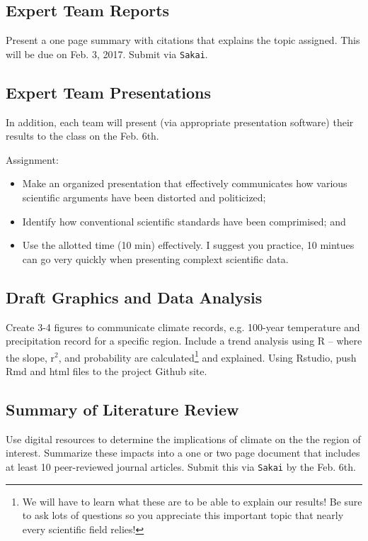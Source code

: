\documentclass{article}\usepackage[]{graphicx}\usepackage[]{color}
\begin{document}
\subsection{Expert Team Reports}

Present a one page summary with citations that explains the topic assigned. This will be due on Feb. 3, 2017. Submit via \texttt{Sakai}. 

\subsection{Expert Team Presentations}

In addition, each team will present (via appropriate presentation software) their results to the class on the Feb. 6th. 

\noindent Assignment: 
\begin{itemize}
  \item Make an organized presentation that effectively communicates how various scientific arguments have been distorted and politicized;
  \item Identify how conventional scientific standards have been comprimised; and
  \item Use the allotted time (10 min) effectively. I suggest you practice, 10 mintues can go very quickly when presenting complext scientific data.
  
\end{itemize}

\subsection{Draft Graphics and Data Analysis}

Create 3-4 figures to communicate climate records, e.g. 100-year temperature and precipitation record for a specific region. Include a trend analysis using R -- where the slope, r$^2$, and probability are calculated\footnote{We will have to learn what these are to be able to explain our results! Be sure to ask lots of questions so you appreciate this important topic that nearly every scientific field relies!} and explained. Using Rstudio, push Rmd and html files to the project Github site. 

\subsection{Summary of Literature Review}

Use digital resources to determine the implications of climate on the the region of interest. Summarize these impacts into a one or two page document that includes at least 10 peer-reviewed journal articles. Submit this via \texttt{Sakai} by the Feb. 6th. 
\end{document}
